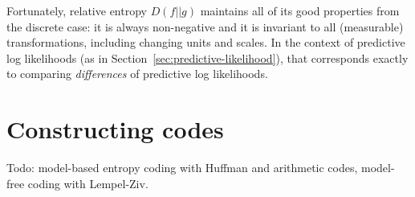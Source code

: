 \documentclass{article}
\begin{document}
    Fortunately, relative entropy $D(f||g)$ maintains all of its good
    properties from the discrete case: it is always non-negative and it is
    invariant to all (measurable) transformations, including changing units and
    scales. In the context of predictive log likelihoods (as in
    Section~\ref{sec:predictive-likelihood}), that corresponds exactly to
    comparing \emph{differences} of predictive log likelihoods.

    \section{Constructing codes}
    \label{sec:coding}
    Todo: model-based entropy coding with Huffman and arithmetic codes,
    model-free coding with Lempel-Ziv.

    \printbibliography
\end{document}
